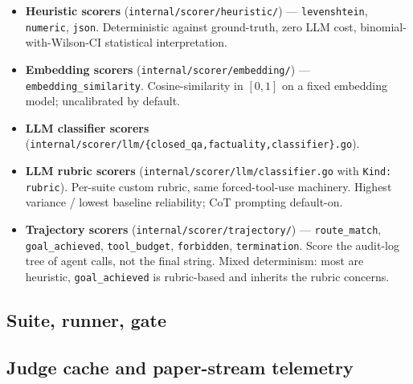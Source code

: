 \begin{itemize}[leftmargin=*]
  \item \textbf{Heuristic scorers} (\texttt{internal/scorer/heuristic/})
        --- \texttt{levenshtein}, \texttt{numeric}, \texttt{json}.
        Deterministic against ground-truth, zero LLM cost,
        binomial-with-Wilson-CI statistical interpretation.
  \item \textbf{Embedding scorers}
        (\texttt{internal/scorer/embedding/}) ---
        \texttt{embedding\_similarity}. Cosine-similarity in $[0, 1]$
        on a fixed embedding model; uncalibrated by default.
  \item \textbf{LLM classifier scorers}
        (\texttt{internal/scorer/llm/\{closed\_qa,factuality,classifier\}.go}).
  \item \textbf{LLM rubric scorers}
        (\texttt{internal/scorer/llm/classifier.go} with \texttt{Kind: rubric}).
        Per-suite custom rubric, same forced-tool-use machinery.
        Highest variance / lowest baseline reliability; CoT prompting
        \cite{liu2023geval} default-on.
  \item \textbf{Trajectory scorers}
        (\texttt{internal/scorer/trajectory/}) ---
        \texttt{route\_match}, \texttt{goal\_achieved},
        \texttt{tool\_budget}, \texttt{forbidden}, \texttt{termination}.
        Score the audit-log tree of agent calls, not the final string.
        Mixed determinism: most are heuristic, \texttt{goal\_achieved}
        is rubric-based and inherits the rubric concerns.
\end{itemize}

\subsection{Suite, runner, gate}


\subsection{Judge cache and paper-stream telemetry}

